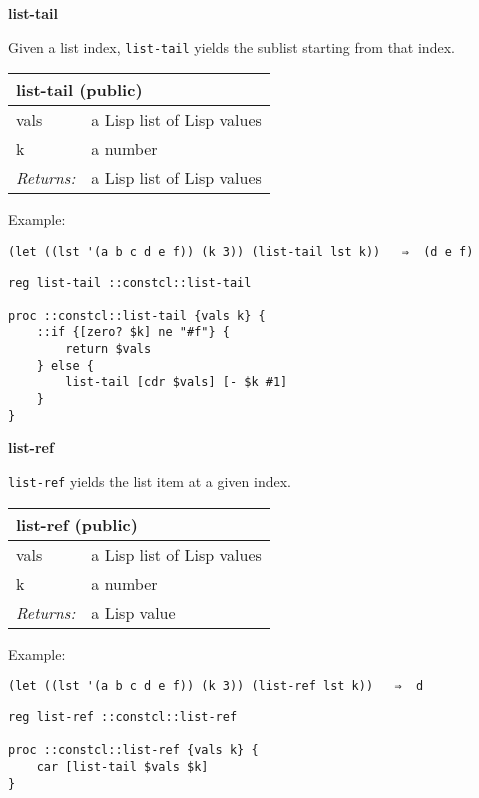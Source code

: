 \documentclass{report}
\begin{document}
\textbf{list-tail}


Given a list index, \texttt{list-tail} yields the sublist starting from that index.

\begin{tabular}{ |l l| }
\hline
\multicolumn{2}{|l|}{list-tail (public)} \\
\hline
vals & a Lisp list of Lisp values \\
k & a number \\
\textit{Returns:} & a Lisp list of Lisp values \\
\hline
\end{tabular}


Example:

\noindent\makebox[\linewidth]{\rule{\linewidth}{0.4pt}}
\begin{lstlisting}
(let ((lst '(a b c d e f)) (k 3)) (list-tail lst k))   ⇒  (d e f)
\end{lstlisting}
\noindent\makebox[\linewidth]{\rule{\linewidth}{0.4pt}}
\noindent\makebox[\linewidth]{\rule{\linewidth}{0.4pt}}
\begin{lstlisting}
reg list-tail ::constcl::list-tail
 
proc ::constcl::list-tail {vals k} {
    ::if {[zero? $k] ne "#f"} {
        return $vals
    } else {
        list-tail [cdr $vals] [- $k #1]
    }
}
\end{lstlisting}
\noindent\makebox[\linewidth]{\rule{\linewidth}{0.4pt}}

\textbf{list-ref}


\texttt{list-ref} yields the list item at a given index.

\begin{tabular}{ |l l| }
\hline
\multicolumn{2}{|l|}{list-ref (public)} \\
\hline
vals & a Lisp list of Lisp values \\
k & a number \\
\textit{Returns:} & a Lisp value \\
\hline
\end{tabular}


Example:

\noindent\makebox[\linewidth]{\rule{\linewidth}{0.4pt}}
\begin{lstlisting}
(let ((lst '(a b c d e f)) (k 3)) (list-ref lst k))   ⇒  d
\end{lstlisting}
\noindent\makebox[\linewidth]{\rule{\linewidth}{0.4pt}}
\noindent\makebox[\linewidth]{\rule{\linewidth}{0.4pt}}
\begin{lstlisting}
reg list-ref ::constcl::list-ref
 
proc ::constcl::list-ref {vals k} {
    car [list-tail $vals $k]
}
\end{lstlisting}
\noindent\makebox[\linewidth]{\rule{\linewidth}{0.4pt}}
\end{document}
